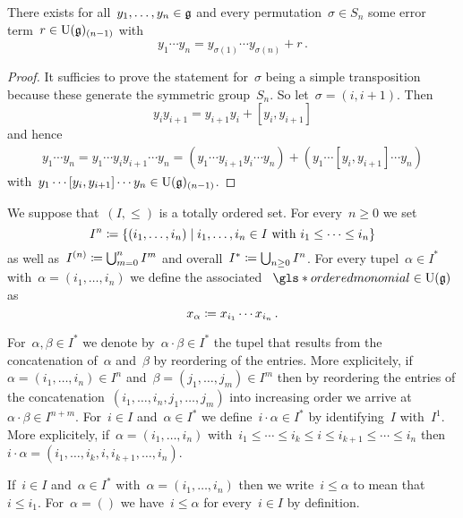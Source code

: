 \begin{lemma}
  \label{rearranging lemma}
  There exists for all~$y_1, \dotsc, y_n \in \mathfrak{g}$ and every permutation~$\sigma \in S_n$ some error term~$r \in \operatorname{U}(\mathfrak{g})_{(n-1)}$ with
  \[
    y_1 \dotsm y_n
    =
    y_{\sigma(1)} \dotsm y_{\sigma(n)}
    +
    r  \,.
  \]
\end{lemma}


\begin{proof}
  It sufficies to prove the statement for~$\sigma$ being a simple transposition because these generate the symmetric group~$S_n$.
  So let~$\sigma = (i, i+1)$.
  Then
  \[
    y_i y_{i+1}
    =
    y_{i+1} y_i + [y_i, y_{i+1}]
  \]
  and hence
  \begin{align*}
    y_1 \dotsm y_n
    =
    y_1 \dotsm y_i y_{i+1} \dotsm y_n
    =
    (y_1 \dotsm y_{i+1} y_i \dotsm y_n)
    +
    (y_1 \dotsm [y_i, y_{i+1}] \dotsm y_n)
  \end{align*}
  with~$y_1 \dotsm [y_i, y_{i+1}] \dotsm y_n \in \operatorname{U}(\mathfrak{g})_{(n-1)}$.
\end{proof}


\begin{convention}
  We suppose that~$(I, \leq)$ is a totally ordered set.
  For every~$n \geq 0$ we set
  \[
    I^n
    \defined
    \{
      (i_1, \dotsc, i_n)
    \suchthat
      \text{$i_1, \dotsc, i_n \in I$ with~$i_1 \leq \dotsb \leq i_n$}
    \}
  \]
  as well as~$I^{(n)} \coloneqq \bigcup_{m=0}^n I^m$ and overall~$I^* \coloneqq \bigcup_{n \geq 0} I^n$.
  For every tupel~$\alpha \in I^*$ with~$\alpha = (i_1, \dotsc, i_n)$ we define the associated ~$\gls*{ordered monomial} \in \Univ(\glie)$ as
  \[
    x_\alpha
    \coloneqq
    x_{i_1} \dotsm x_{i_n}  \,.
  \]
  
  For~$\alpha, \beta \in I^*$ we denote by~$\alpha \cdot \beta \in I^*$ the tupel that results from the concatenation of~$\alpha$ and~$\beta$ by reordering of the entries.
  More explicitely, if~$\alpha = (i_1, \dotsc, i_n) \in I^n$ and~$\beta = (j_1, \dotsc, j_m) \in I^m$ then by reordering the entries of the concatenation~$(i_1, \dotsc, i_n, j_1, \dotsc, j_m)$ into increasing order we arrive at~$\alpha \cdot \beta \in I^{n+m}$.
  For~$i \in I$ and~$\alpha \in I^*$ we define~$i \cdot \alpha \in I^*$ by identifying~$I$ with~$I^1$.
  More explicitely, if~$\alpha = (i_1, \dotsc, i_n)$ with~$i_1 \leq \dotsb \leq i_k \leq i \leq i_{k+1} \leq \dotsb \leq i_n$ then~$i \cdot \alpha = (i_1, \dotsc, i_k, i, i_{k+1}, \dotsc, i_n)$.
  
  If~$i \in I$ and~$\alpha \in I^*$ with~$\alpha = (i_1, \dotsc, i_n)$ then we write~$i \leq \alpha$ to mean that~$i \leq i_1$.
  For~$\alpha = ()$ we have~$i \leq \alpha$ for every~$i \in I$ by definition.
\end{convention}


